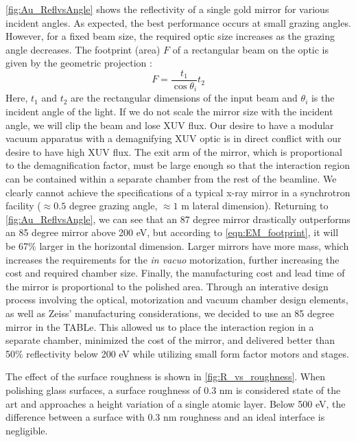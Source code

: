 \cref{fig:Au_ReflvsAngle} shows the reflectivity of a single gold mirror for various incident angles. As expected, the best performance occurs at small grazing angles. However, for a fixed beam size, the required optic size increases as the grazing angle decreases. The footprint (area) $F$ of a rectangular beam on the optic is given by the geometric projection \cite{gibaudSpecularReflectivitySmooth2009}:
\begin{equation}
F = \frac{t_1}{\cos \theta_i}t_2
\label{eqn:EM_footprint}
\end{equation}
Here, $t_1$ and $t_2$ are the rectangular dimensions of the input beam and $\theta_i$ is the incident angle of the light. If we do not scale the mirror size with the incident angle, we will clip the beam and lose XUV flux. Our desire to have a modular vacuum apparatus with a demagnifying XUV optic is in direct conflict with our desire to have high XUV flux. The exit arm of the mirror, which is proportional to the demagnification factor, must be large enough so that the interaction region can be contained within a separate chamber from the rest of the beamline. We clearly cannot achieve the specifications of a typical x-ray mirror in a synchrotron facility ($\approx 0.5$ degree grazing angle, $\approx 1$ m lateral dimension). Returning to \cref{fig:Au_ReflvsAngle}, we can see that an 87 degree mirror drastically outperforms an 85 degree mirror above 200 eV, but according to \cref{eqn:EM_footprint}, it will be 67\% larger in the horizontal dimension. Larger mirrors have more mass, which increases the requirements for the \textit{in vacuo} motorization, further increasing the cost and required chamber size. Finally, the manufacturing cost and lead time of the mirror is proportional to the polished area. Through an interative design process involving the optical, motorization and vacuum chamber design elements, as well as Zeiss' manufacturing considerations, we decided to use an 85 degree mirror in the TABLe. This allowed us to place the interaction region in a separate chamber, minimized the cost of the mirror, and delivered better than 50\% reflectivity below 200 eV while utilizing small form factor motors and stages. 

The effect of the surface roughness is shown in \cref{fig:R_vs_roughness}. When polishing glass surfaces, a surface roughness of 0.3 nm is considered state of the art and approaches a height variation of a single atomic layer. Below 500 eV, the difference between a surface with 0.3 nm roughness and an ideal interface is negligible. 

